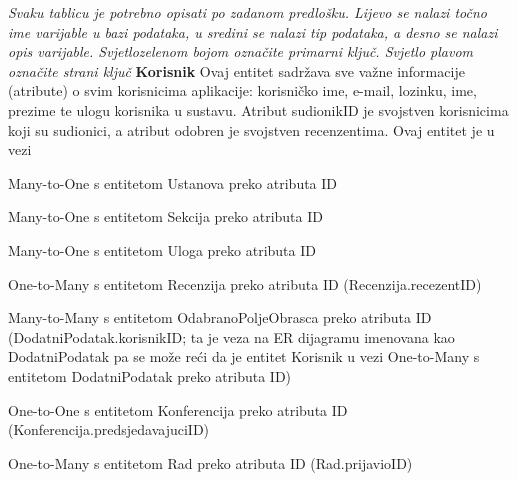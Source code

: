 				\textit{Svaku tablicu je potrebno opisati po zadanom predlošku. Lijevo se nalazi točno ime varijable u bazi podataka, u sredini se nalazi tip podataka, a desno se nalazi opis varijable. Svjetlozelenom bojom označite primarni ključ. Svjetlo plavom označite strani ključ}
				\newline
				\textbf{Korisnik}
				Ovaj entitet sadržava sve važne informacije (atribute) o svim korisnicima aplikacije: korisničko ime, e-mail, lozinku, ime, prezime te ulogu korisnika u sustavu. Atribut sudionikID je svojstven korisnicima koji su sudionici, a atribut odobren je svojstven recenzentima. Ovaj entitet je u vezi \begin{packed_item} 
					\item Many-to-One s entitetom Ustanova preko atributa ID
					\item Many-to-One s entitetom Sekcija preko atributa ID
					\item Many-to-One s entitetom Uloga preko atributa ID
					\item One-to-Many s entitetom Recenzija preko atributa ID (Recenzija.recezentID)
					\item Many-to-Many s entitetom OdabranoPoljeObrasca preko atributa ID (DodatniPodatak.korisnikID; ta je veza na ER dijagramu imenovana kao DodatniPodatak pa se može reći da je entitet Korisnik u vezi One-to-Many s entitetom DodatniPodatak preko atributa ID)
					\item One-to-One s entitetom Konferencija preko atributa ID (Konferencija.predsjedavajuciID)
					\item One-to-Many s entitetom Rad preko atributa ID (Rad.prijavioID)
				\end{packed_item}
